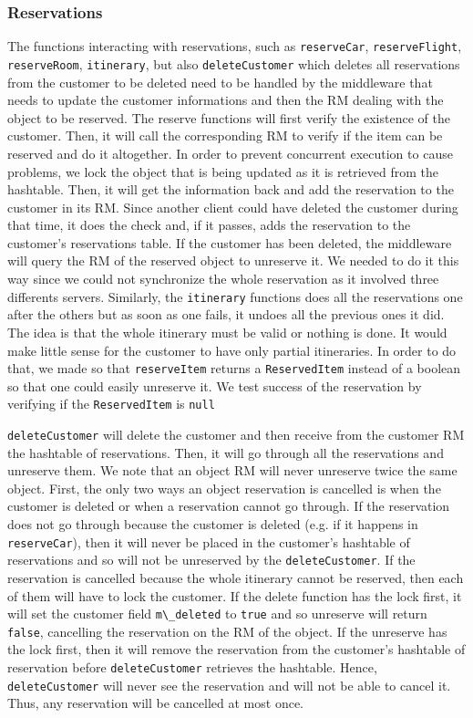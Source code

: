 \documentclass[12pt]{article}
\theoremstyle{plain}%
\theoremstyle{definition}
\theoremstyle{remark}
\newcommand{\java}[1]{{\lstinline!#1!}}
\begin{document}
\subsubsection*{Reservations}
The functions interacting with reservations, such as
\java{reserveCar}, \java{reserveFlight}, \java{reserveRoom},
\java{itinerary}, but also \java{deleteCustomer} which deletes all
reservations from the customer to be deleted need to be handled by the
middleware that needs to update the customer informations and then the
RM dealing with the object to be reserved. The reserve functions will
first verify the existence of the customer. Then, it will call the
corresponding RM to verify if the item can be reserved and do it
altogether. In order to prevent concurrent execution to cause
problems, we lock the object that is being updated as it is retrieved
from the hashtable. Then, it will get the information back and add the
reservation to the customer in its RM. Since another client could have
deleted the customer during that time, it does the check and, if it
passes, adds the reservation to the customer's reservations table. If
the customer has been deleted, the middleware will query the RM of the
reserved object to unreserve it. We needed to do it this way since we
could not synchronize the whole reservation as it involved three
differents servers. Similarly, the \java{itinerary} functions does all the
reservations one after the others but as soon as one fails, it undoes
all the previous ones it did. The idea is that the whole itinerary
must be valid or nothing is done. It would make little sense for the
customer to have only partial itineraries. In order to do that, we
made so that \java{reserveItem} returns a \java{ReservedItem} instead
of a boolean so that one could easily unreserve it. We test
success of the reservation by verifying if the \java{ReservedItem} is \java{null}

 \java{deleteCustomer} will delete the
 customer and then receive from the customer RM the hashtable of
 reservations. Then, it will go through all the reservations and
 unreserve them. We note that an object RM will never unreserve twice
 the same object. First, the only two ways an object reservation is
 cancelled is when the customer is deleted or when a reservation cannot
 go through. If the reservation does not go through because the
 customer is deleted (e.g. if it happens in \java{reserveCar}), then it
 will never be placed in the customer's hashtable of reservations and
 so will not be unreserved by the \java{deleteCustomer}. If the
 reservation is cancelled because the whole itinerary cannot be
 reserved, then each of them will have to lock the customer. If the
 delete function has the lock first, it will set the customer field
 \java{m\_deleted} to \java{true} and so unreserve will return \java{false},
 cancelling the reservation on the RM of the object. If the unreserve
 has the lock first, then it will remove the reservation from the
 customer's hashtable of reservation before \java{deleteCustomer}
 retrieves the hashtable. Hence, \java{deleteCustomer} will never see
 the reservation and will not be able to cancel it. Thus, any
 reservation will be cancelled at most once.
\end{document}
